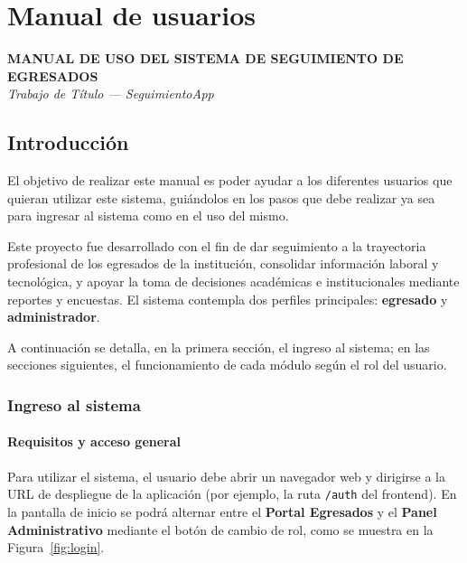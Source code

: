 
\chapter{Manual de usuarios}
\label{ap:manual-usuario}

\begin{center}
\textbf{MANUAL DE USO DEL SISTEMA DE SEGUIMIENTO DE EGRESADOS}\\[0.5em]
\textit{Trabajo de Título --- SeguimientoApp}
\end{center}

\section{Introducción}
\label{sec:manual-intro}

El objetivo de realizar este manual es poder ayudar a los diferentes usuarios que quieran utilizar este sistema, guiándolos en los pasos que debe realizar ya sea para ingresar al sistema como en el uso del mismo.

Este proyecto fue desarrollado con el fin de dar seguimiento a la trayectoria profesional de los egresados de la institución, consolidar información laboral y tecnológica, y apoyar la toma de decisiones académicas e institucionales mediante reportes y encuestas. El sistema contempla dos perfiles principales: \textbf{egresado} y \textbf{administrador}.

A continuación se detalla, en la primera sección, el ingreso al sistema; en las secciones siguientes, el funcionamiento de cada módulo según el rol del usuario.

\subsection{Ingreso al sistema}
\label{subsec:manual-ingreso}

\subsubsection{Requisitos y acceso general}

Para utilizar el sistema, el usuario debe abrir un navegador web y dirigirse a la URL de despliegue de la aplicación (por ejemplo, la ruta \texttt{/auth} del frontend). En la pantalla de inicio se podrá alternar entre el \textbf{Portal Egresados} y el \textbf{Panel Administrativo} mediante el botón de cambio de rol, como se muestra en la Figura~\ref{fig:login}.

